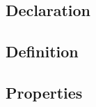 \def\Subsection#1{\subsection{#1}}

\Subsection{Declaration}

\Subsection{Definition}

\Subsection{Properties}
